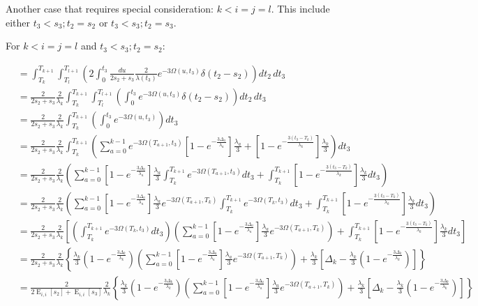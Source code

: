 \documentclass{article}
\DeclareMathOperator{\E}{E}
\begin{document}
Another case that requires special consideration: $k<i=j=l$. This include
either $t_3<s_3;t_2=s_2$ or $t_3<s_3;t_2=s_3$.

For $k<i=j=l$ and $t_3<s_3;t_2=s_2$:

\begin{align*}
    &=\int_{T_k}^{T_{k+1}}\int_{T_l}^{T_{l+1}}\left(
    2\int_0^{t_3}\frac{du}{2s_2+s_3}\frac{2}{\lambda(t_3)}e^{-3\Omega(u,t_3)}\delta(t_2-s_2)
    \right)dt_2\,dt_3\\
    &=\frac{2}{2s_2+s_3}\frac{2}{\lambda_k}\int_{T_k}^{T_{k+1}}\int_{T_l}^{T_{l+1}}\left(
    \int_0^{t_3}e^{-3\Omega(u,t_3)}\delta(t_2-s_2)
    \right)dt_2\,dt_3\\
    &=\frac{2}{2s_2+s_3}\frac{2}{\lambda_k}\int_{T_k}^{T_{k+1}}\left(
    \int_0^{t_3}e^{-3\Omega(u,t_3)}
    \right)dt_3\\
    &=\frac{2}{2s_2+s_3}\frac{2}{\lambda_k}\int_{T_k}^{T_{k+1}}\left(
    \sum_{a=0}^{k-1} e^{-3\Omega(T_{a+1},t_3)}
    \left[1-e^{-\frac{3 \Delta_a}{\lambda_a}}\right]\frac{\lambda_a}{3}+
    \left[1-e^{-\frac{3\left(t_3-T_{k}\right)}{\lambda_{k}}}\right]\frac{\lambda_{k}}{3}
    \right)dt_3\\
    &=\frac{2}{2s_2+s_3}\frac{2}{\lambda_k}\left(
    \sum_{a=0}^{k-1} 
    \left[1-e^{-\frac{3 \Delta_a}{\lambda_a}}\right]\frac{\lambda_a}{3}\int_{T_k}^{T_{k+1}}e^{-3\Omega(T_{a+1},t_3)}dt_3+
    \int_{T_k}^{T_{k+1}}\left[1-e^{-\frac{3\left(t_3-T_{k}\right)}{\lambda_{k}}}\right]\frac{\lambda_{k}}{3}dt_3
    \right)\\
    &=\frac{2}{2s_2+s_3}\frac{2}{\lambda_k}\left(
    \sum_{a=0}^{k-1} 
    \left[1-e^{-\frac{3 \Delta_a}{\lambda_a}}\right]\frac{\lambda_a}{3}e^{-3\Omega(T_{a+1},T_k)}\int_{T_k}^{T_{k+1}}e^{-3\Omega(T_k,t_3)}dt_3+
    \int_{T_k}^{T_{k+1}}\left[1-e^{-\frac{3\left(t_3-T_{k}\right)}{\lambda_{k}}}\right]\frac{\lambda_{k}}{3}dt_3
    \right)\\
    &=\frac{2}{2s_2+s_3}\frac{2}{\lambda_k}\left[
    \left(\int_{T_k}^{T_{k+1}}e^{-3\Omega(T_k,t_3)}dt_3\right)
    \left(\sum_{a=0}^{k-1} 
    \left[1-e^{-\frac{3 \Delta_a}{\lambda_a}}\right]\frac{\lambda_a}{3}e^{-3\Omega(T_{a+1},T_k)}\right)+
    \int_{T_k}^{T_{k+1}}\left[1-e^{-\frac{3\left(t_3-T_{k}\right)}{\lambda_{k}}}\right]\frac{\lambda_{k}}{3}dt_3
    \right]\\
    &=\frac{2}{2s_2+s_3}\frac{2}{\lambda_k}\left\{
    \frac{\lambda_k}{3}\left(1-e^{-\frac{3\Delta_k}{\lambda_k}}\right)
    \left(\sum_{a=0}^{k-1} 
    \left[1-e^{-\frac{3 \Delta_a}{\lambda_a}}\right]\frac{\lambda_a}{3}e^{-3\Omega(T_{a+1},T_k)}\right)+
    \frac{\lambda_k}{3}\left[\Delta_k-\frac{\lambda_k}{3}\left(1-e^{-\frac{3\Delta_k}{\lambda_k}}\right)\right]
    \right\}\\
    &=\frac{2}{2\E_{i,i}[s_2]+\E_{i,i}[s_3]}\frac{2}{\lambda_k}\left\{
    \frac{\lambda_k}{3}\left(1-e^{-\frac{3\Delta_k}{\lambda_k}}\right)
    \left(\sum_{a=0}^{k-1} 
    \left[1-e^{-\frac{3 \Delta_a}{\lambda_a}}\right]\frac{\lambda_a}{3}e^{-3\Omega(T_{a+1},T_k)}\right)+
    \frac{\lambda_k}{3}\left[\Delta_k-\frac{\lambda_k}{3}\left(1-e^{-\frac{3\Delta_k}{\lambda_k}}\right)\right]
    \right\}\\
\end{align*}
\end{document}
